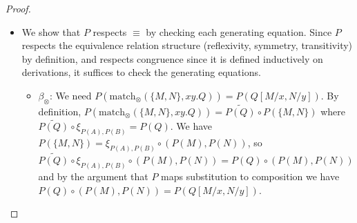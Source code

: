 \begin{proof}
\begin{itemize}
\begin{itemize}
\[    \]
    We also have that 
    \[
    P\left(\sum_{k_1 = 1}^{i_1} \ldots \sum_{k_n=1}^{i_n} f(N_{1 k_1}, \ldots, N_{n k_n})\right) \circ P(M) = \sum_{k_1 = 1}^{i_1} \ldots \sum_{k_n=1}^{i_n}(P(f) \circ (P(N_{1 k_1}), \ldots, P(N_{n k_n})) \circ P(M))
    \]
    and
    \[
    \left(\sum_{k_1 = 1}^{i_1} \ldots \sum_{k_n=1}^{i_n} f(N_{1 k_1}, \ldots, N_{n k_n})\right)[M/x] = \sum_{k_1 = 1}^{i_1} \ldots \sum_{k_n=1}^{i_n} f(N_{1 k_1}, \ldots, N_{j k_j}[M/x], \ldots, N_{n k_n}),
    \]
    and
    \begin{align*}
    P\left(\sum_{k_1 = 1}^{i_1} \ldots \sum_{k_n=1}^{i_n} f(N_{1 k_1}, \ldots, N_{n k_n})[M/x]\right) &=\\ 
    &= \sum_{k_1 = 1}^{i_1} \ldots \sum_{k_n=1}^{i_n} P(f) \circ (P(N_{1 k_1}), \ldots, P(N_{j k_j}[M/x]), \ldots, P(N_{n k_n}))\\
    &\text{by IH}\\
    &= \sum_{k_1 = 1}^{i_1} \ldots \sum_{k_n=1}^{i_n} P(f) \circ (P(N_{1 k_1}), \ldots, P(N_{j k_j}) \circ P(M), \ldots, P(N_{n k_n})).
    \end{align*}
    By the associativity axiom of $\mathcal{M}$ applied in the $j$-th slot, we have
    \[
    P(f) \circ (P(N_{1k_1}),\ldots,P(N_{jk_j}) \circ P(M),\ldots,P(N_{nk_n})) = P(f) \circ (P(N_{1k_1}),\ldots,P(N_{nk_n})) \circ P(M)
    \]
    and therefore
    \begin{align*}
      P\left(\sum_{k_1 = 1}^{i_1} \ldots \sum_{k_n=1}^{i_n} f(N_{1 k_1}, \ldots, N_{n k_n})[M/x]\right) &=\\
      &= \sum_{k_1 = 1}^{i_1} \ldots \sum_{k_n=1}^{i_n} \left( P(f) \circ (P(N_{1 k_1}), \ldots, P(N_{j k_j}), \ldots, P(N_{n k_n})) \circ P(M)\right)\\
      &= P\left(\sum_{k_1 = 1}^{i_1} \ldots \sum_{k_n=1}^{i_n} f(N_{1k_1},\ldots,N_{nk_n})\right) \circ P(M).
    \end{align*}
    \item The rest of the cases are analogous.
  \end{itemize}
  \item We show that $P$ respects $\equiv$ by checking each generating equation.
Since $P$ respects the equivalence relation structure (reflexivity, symmetry,
transitivity) by definition, and respects congruence since it is defined
inductively on derivations, it suffices to check the generating equations.

\begin{itemize}
  \item \textbf{$\beta_\otimes$}: We need $P(\text{match}_\otimes(\{M,N\}, xy.Q)) =
  P(Q[M/x, N/y])$.
  By definition, $P(\text{match}_\otimes(\{M,N\},xy.Q)) = \widetilde{P(Q)} \circ
  P(\{M,N\})$ where $\widetilde{P(Q)} \circ \xi_{P(A),P(B)} = P(Q)$.
  We have $P(\{M,N\}) = \xi_{P(A),P(B)} \circ (P(M), P(N))$, so
  \[
  \widetilde{P(Q)} \circ \xi_{P(A),P(B)} \circ (P(M), P(N)) = P(Q) \circ (P(M), P(N))
  \]
  and by the argument that $P$ maps substitution to composition we have
  $P(Q) \circ (P(M), P(N)) = P(Q[M/x, N/y])$.


\end{itemize}
\end{itemize}
\end{proof}
